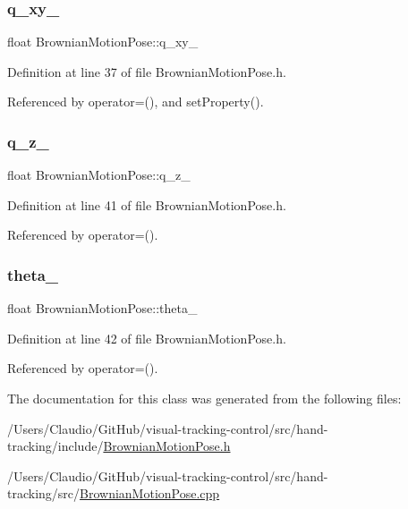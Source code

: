 \subsubsection{\texorpdfstring{q\+\_\+xy\+\_\+}{q\_xy\_}}
{\footnotesize\ttfamily float Brownian\+Motion\+Pose\+::q\+\_\+xy\+\_\+\hspace{0.3cm}{\ttfamily [protected]}}



Definition at line 37 of file Brownian\+Motion\+Pose.\+h.



Referenced by operator=(), and set\+Property().

\mbox{\label{classBrownianMotionPose_ac5c6eb8bc9bbd4a2e2fb4a70d89c3c8d}} 
\subsubsection{\texorpdfstring{q\+\_\+z\+\_\+}{q\_z\_}}
{\footnotesize\ttfamily float Brownian\+Motion\+Pose\+::q\+\_\+z\+\_\+\hspace{0.3cm}{\ttfamily [protected]}}



Definition at line 41 of file Brownian\+Motion\+Pose.\+h.



Referenced by operator=().

\mbox{\label{classBrownianMotionPose_a708069c13925ecb0d11a58519948bf1b}} 
\subsubsection{\texorpdfstring{theta\+\_\+}{theta\_}}
{\footnotesize\ttfamily float Brownian\+Motion\+Pose\+::theta\+\_\+\hspace{0.3cm}{\ttfamily [protected]}}



Definition at line 42 of file Brownian\+Motion\+Pose.\+h.



Referenced by operator=().



The documentation for this class was generated from the following files\+:\begin{DoxyCompactItemize}
\item 
/\+Users/\+Claudio/\+Git\+Hub/visual-\/tracking-\/control/src/hand-\/tracking/include/\hyperlink{BrownianMotionPose_8h}{Brownian\+Motion\+Pose.\+h}\item 
/\+Users/\+Claudio/\+Git\+Hub/visual-\/tracking-\/control/src/hand-\/tracking/src/\hyperlink{BrownianMotionPose_8cpp}{Brownian\+Motion\+Pose.\+cpp}\end{DoxyCompactItemize}
